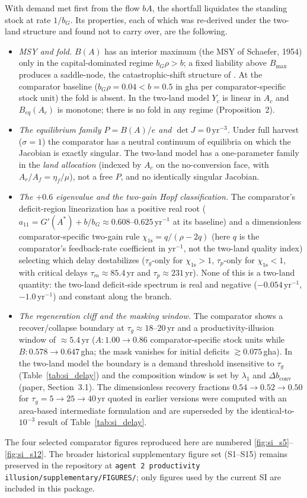 \documentclass[11pt,a4paper]{article}
\newcommand{\dconv}{\Delta b_{\mathrm{conv}}}
\begin{document}
With demand met first from the flow $bA$, the shortfall liquidates the standing stock at rate $1/b_G$. Its properties, each of which was re-derived under the two-land structure and found not to carry over, are the following.
\begin{itemize}[leftmargin=1.5em]
\item \emph{MSY and fold.} $B(A)$ has an interior maximum (the MSY of Schaefer, 1954) only in the capital-dominated regime $b_G\rho>b$; a fixed liability above $B_{\max}$ produces a saddle-node, the catastrophic-shift structure of \citet{Scheffer2001}. At the comparator baseline ($b_G\rho=0.04<b=0.5$ in gha per comparator-specific stock unit) the fold is absent. In the two-land model $Y_c$ is linear in $A_c$ and $B_{eq}(A_c)$ is monotone; there is no fold in any regime (Proposition~2).
\item \emph{The equilibrium family $P=B(A)/e$ and $\det J=0\,\mathrm{yr}^{-3}$.} Under full harvest ($\sigma=1$) the comparator has a neutral continuum of equilibria on which the Jacobian is exactly singular. The two-land model has a one-parameter family in the \emph{land allocation} (indexed by $A_c$ on the no-conversion face, with $A_r/A_f=\eta_f/\mu$), not a free $P$, and no identically singular Jacobian.
\item \emph{The $+0.6$ eigenvalue and the two-gain Hopf classification.} The comparator's deficit-region linearization has a positive real root ($a_{11}=G'(A^*)+b/b_G\approx0.608$--$0.625$\,yr$^{-1}$ at its baseline) and a dimensionless comparator-specific two-gain rule $\chi_{\mathrm{1s}}=q/(\rho-2q)$ (here $q$ is the comparator's feedback-rate coefficient in yr$^{-1}$, not the two-land quality index) selecting which delay destabilizes ($\tau_g$-only for $\chi_{\mathrm{1s}}>1$, $\tau_p$-only for $\chi_{\mathrm{1s}}<1$, with critical delays $\tau_m\approx85.4$\,yr and $\tau_p\approx231$\,yr). None of this is a two-land quantity: the two-land deficit-side spectrum is real and negative ($-0.054\,\mathrm{yr}^{-1}$, $-1.0\,\mathrm{yr}^{-1}$) and constant along the branch.
\item \emph{The regeneration cliff and the masking window.} The comparator shows a recover/collapse boundary at $\tau_g\approx18$--$20$\,yr and a productivity-illusion window of $\approx5.4$\,yr ($A:1.00\to0.86$ comparator-specific stock units while $B:0.578\to0.647$\,gha; the mask vanishes for initial deficits $\gtrsim0.075$\,gha). In the two-land model the boundary is a demand threshold insensitive to $\tau_g$ (Table~\ref{tab:si_delay}) and the composition window is set by $\lambda_1$ and $\dconv$ (paper, Section~3.1). The dimensionless recovery fractions $0.54\to0.52\to0.50$ for $\tau_g=5\to25\to40$\,yr quoted in earlier versions were computed with an area-based intermediate formulation and are superseded by the identical-to-$10^{-3}$ result of Table~\ref{tab:si_delay}.
\end{itemize}
The four selected comparator figures reproduced here are numbered \ref{fig:si_s5}--\ref{fig:si_s12}. The broader historical supplementary figure set (S1--S15) remains preserved in the repository at \texttt{agent 2 productivity illusion/supplementary/FIGURES/}; only figures used by the current SI are included in this package.
\end{document}
